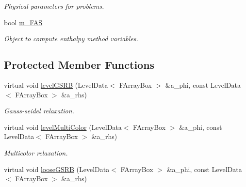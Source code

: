 \begin{DoxyCompactItemize}
\begin{DoxyCompactList}\small\item\em Physical parameters for problems. \end{DoxyCompactList}\item 
bool \hyperlink{class_a_m_r_non_linear_multi_comp_op_a56ee2a89dc1bce9701951d48633fc808}{m\-\_\-\-F\-A\-S}
\begin{DoxyCompactList}\small\item\em Object to compute enthalpy method variables. \end{DoxyCompactList}\end{DoxyCompactItemize}
\subsection*{Protected Member Functions}
\begin{DoxyCompactItemize}
\item 
\hypertarget{class_a_m_r_non_linear_multi_comp_op_a8ec4d6960ca7282d700aa370b3ce875e}{virtual void \hyperlink{class_a_m_r_non_linear_multi_comp_op_a8ec4d6960ca7282d700aa370b3ce875e}{level\-G\-S\-R\-B} (Level\-Data$<$ F\-Array\-Box $>$ \&a\-\_\-phi, const Level\-Data$<$ F\-Array\-Box $>$ \&a\-\_\-rhs)}\label{class_a_m_r_non_linear_multi_comp_op_a8ec4d6960ca7282d700aa370b3ce875e}

\begin{DoxyCompactList}\small\item\em Gauss-\/seidel relaxation. \end{DoxyCompactList}\item 
\hypertarget{class_a_m_r_non_linear_multi_comp_op_a68cf60aeb967af9a3c7e1c628d7969f2}{virtual void \hyperlink{class_a_m_r_non_linear_multi_comp_op_a68cf60aeb967af9a3c7e1c628d7969f2}{level\-Multi\-Color} (Level\-Data$<$ F\-Array\-Box $>$ \&a\-\_\-phi, const Level\-Data$<$ F\-Array\-Box $>$ \&a\-\_\-rhs)}\label{class_a_m_r_non_linear_multi_comp_op_a68cf60aeb967af9a3c7e1c628d7969f2}

\begin{DoxyCompactList}\small\item\em Multicolor relaxation. \end{DoxyCompactList}\item 
\hypertarget{class_a_m_r_non_linear_multi_comp_op_a2bb1423e981bdf7357bc3faab3385908}{virtual void \hyperlink{class_a_m_r_non_linear_multi_comp_op_a2bb1423e981bdf7357bc3faab3385908}{loose\-G\-S\-R\-B} (Level\-Data$<$ F\-Array\-Box $>$ \&a\-\_\-phi, const Level\-Data$<$ F\-Array\-Box $>$ \&a\-\_\-rhs)}\label{class_a_m_r_non_linear_multi_comp_op_a2bb1423e981bdf7357bc3faab3385908}


\end{DoxyCompactItemize}
